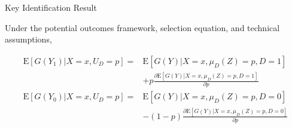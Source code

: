 \documentclass{beamer}
\newcommand{\E}{\mathrm{E}} %
\begin{document}
\begin{frame}[shrink = 1]{Key Identification Result}

\begin{theorem}
  Under the potential outcomes framework, selection equation, and
  technical assumptions,

\vspace{-.25cm}
\begin{align*}
  \E\left[ G(Y_1) | X = x, U_D = p \right] = &\E \left[ G(Y) | X = x, \mu_D(Z) = p, D = 1 \right] \\
  &+ p \frac{\partial \E\left[ G(Y) | X = x, \mu_D(Z) = p, D = 1 \right]}{\partial p} \\
  \E\left[ G(Y_0) | X = x, U_D = p \right] = &\E \left[ G(Y) | X = x, \mu_D(Z) = p, D = 0 \right] \\
  &- (1 - p) \frac{\partial \E\left[ G(Y) | X = x, \mu_D(Z) = p, D = 0 \right]}{\partial p} \\
\end{align*}
\end{theorem}

\end{frame}
\end{document}

